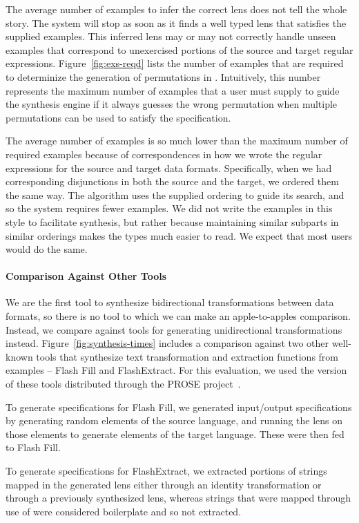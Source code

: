 \documentclass[sigplan,acmsmall]{acmart}
\begin{document}
The average number of examples to
infer the correct lens does not tell the whole story.  The system will
stop as soon as it finds a well typed lens that satisfies the supplied examples.
This inferred lens may or may not 
correctly handle unseen examples that correspond to
unexercised portions of the source and target regular expressions.
Figure~\ref{fig:exs-reqd} lists
the number of examples that are required to determinize the generation of
permutations in \RigidSynth{}.
Intuitively, this number represents the maximum number of
examples that a user must supply to guide the synthesis engine if it
always guesses the wrong permutation when multiple permutations can be used to
satisfy the specification. 

The average number of examples is so much lower than the maximum
number of required examples because of correspondences in how we wrote
the regular expressions for the source and target data formats. 
Specifically, when we had corresponding disjunctions in both the
source and the target, we ordered them the same way.  The algorithm
uses the supplied ordering to guide its search, and so the system
requires fewer examples.   We did not write the examples in this style
to facilitate synthesis, but rather because maintaining similar
subparts in similar orderings makes the types much easier to 
read. We expect that most users would do the same.

\paragraph*{Comparison Against Other Tools}
%
We are the first tool to synthesize bidirectional transformations between data
formats, so there is no tool to which we can make an apple-to-apples comparison.
Instead, we compare against tools for generating unidirectional
transformations instead. 
Figure~\ref{fig:synthesis-times} includes a comparison against two other
well-known tools that synthesize
text transformation and extraction functions from examples -- Flash Fill and FlashExtract.  For this
evaluation, we used the version of these tools distributed through the
PROSE project~\cite{prose}.

To generate specifications for Flash Fill, we generated input/output
specifications by generating random elements of the source language, and
running the lens on those elements to generate elements of the target language.
These were then fed to Flash Fill.

To generate specifications for FlashExtract, we extracted portions of strings
mapped in the generated lens either through an identity
transformation or through a previously synthesized lens, whereas strings that were
mapped through use of \ConstLens{} were considered boilerplate and so not
extracted.
\end{document}
